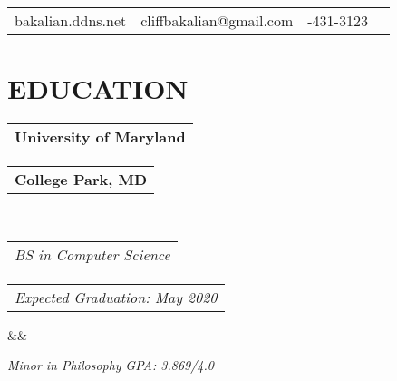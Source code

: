 \documentclass[11pt,a4paper,roman]{moderncv}
\makeatletter
\newcommand*{\customcventry}[7][.25em]{
  \begin{tabular}{@{}l} 
    {\bfseries #4}
  \end{tabular}
  \hfill
  \begin{tabular}{l@{}}
     {\bfseries #5}
  \end{tabular} \\
  \begin{tabular}{@{}l} 
    {\itshape #3}
  \end{tabular}
  \hfill
  \begin{tabular}{l@{}}
     {\itshape #2}
  \end{tabular}
  \ifx&#7&%
  \else{\\%
    \begin{minipage}{\maincolumnwidth}%
      \small#7%
    \end{minipage}}\fi%
  \par\addvspace{#1}}
\makeatother
\begin{document}
\makecvtitle
\vspace*{-23mm}

\begin{center}
\begin{tabular}{ c c c c }
 \enspace bakalian.ddns.net & \enspace cliffbakalian@gmail.com & \enspace 215-431-3123\\  
\end{tabular}
\end{center}

\section{EDUCATION}
{\customcventry{Expected Graduation: May 2020}{BS in Computer Science}{University of Maryland}{College Park, MD}{}{}}
{\itshape Minor in Philosophy} \hfill {\itshape GPA: 3.869/4.0}
\end{document}
